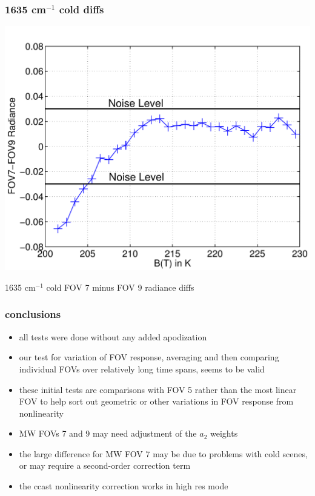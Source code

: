 \documentclass[11pt]{beamer}
\begin{document}
\begin{frame}
\frametitle{1635 cm$^{-1}$ cold diffs}

\begin{center}
  \includegraphics[scale=0.5]{strow/binned_chan1635wn_fov9_minus_fov7_radiance.pdf}
\end{center}

1635 cm$^{-1}$ cold FOV 7 minus FOV 9 radiance diffs

\end{frame}
\begin{frame}
\frametitle{conclusions}

\begin{itemize}
  \item all tests were done without any added apodization

  \item our test for variation of FOV response, averaging and then
    comparing individual FOVs over relatively long time spans, seems
    to be valid

  \item these initial tests are comparisons with FOV 5 rather 
    than the most linear FOV to help sort out geometric or other
    variations in FOV response from nonlinearity

  \item MW FOVs 7 and 9 may need adjustment of the $a_2$ weights

  \item the large difference for MW FOV 7 may be due to problems 
    with cold scenes, or may require a second-order correction term

  \item the ccast nonlinearity correction works in high res mode

\end{itemize}

\end{frame}
\end{document}
